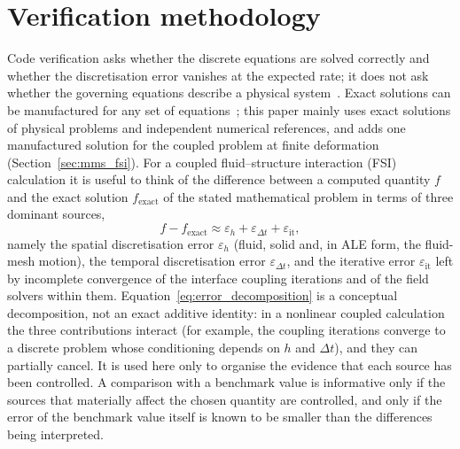 \section{Verification methodology}\label{sec:verification_methodology}

Code verification asks whether the discrete equations are solved correctly and whether the discretisation error vanishes at the expected rate; it does not ask whether the governing equations describe a physical system~\citep{Roache1998, Roy2005, Oberkampf2008, Oberkampf2010}. Exact solutions can be manufactured for any set of equations~\citep{Roache2002}; this paper mainly uses exact solutions of physical problems and independent numerical references, and adds one manufactured solution for the coupled problem at finite deformation (Section~\ref{sec:mms_fsi}).
For a coupled fluid--structure interaction (FSI) calculation it is useful to think of the difference between a computed quantity $f$ and the exact solution $f_\mathrm{exact}$ of the stated mathematical problem in terms of three dominant sources,
\begin{equation}
	f - f_\mathrm{exact} \approx \varepsilon_h + \varepsilon_{\Delta t} + \varepsilon_\mathrm{it},
	\label{eq:error_decomposition}
\end{equation}
namely the spatial discretisation error $\varepsilon_h$ (fluid, solid and, in ALE form, the fluid-mesh motion), the temporal discretisation error $\varepsilon_{\Delta t}$, and the iterative error $\varepsilon_\mathrm{it}$ left by incomplete convergence of the interface coupling iterations and of the field solvers within them.
Equation~\eqref{eq:error_decomposition} is a conceptual decomposition, not an exact additive identity: in a nonlinear coupled calculation the three contributions interact (for example, the coupling iterations converge to a discrete problem whose conditioning depends on $h$ and $\Delta t$), and they can partially cancel.
It is used here only to organise the evidence that each source has been controlled.
A comparison with a benchmark value is informative only if the sources that materially affect the chosen quantity are controlled, and only if the error of the benchmark value itself is known to be smaller than the differences being interpreted.

